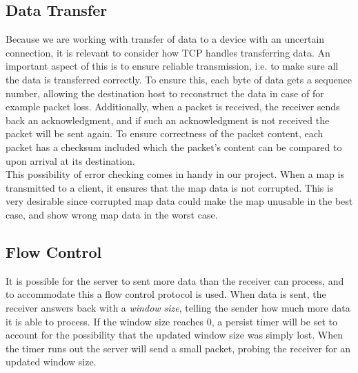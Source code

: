 \subsection{Data Transfer}
Because we are working with transfer of data to a device with an uncertain connection, it is relevant to consider how TCP handles transferring data. An important aspect of this is to ensure reliable transmission, i.e. to make sure all the data is transferred correctly. To ensure this, each byte of data gets a sequence number, allowing the destination host to reconstruct the data in case of for example packet loss. Additionally, when a packet is received, the receiver sends back an acknowledgment, and if such an acknowledgment is not received the packet will be sent again. To ensure correctness of the packet content, each packet has a checksum included which the packet's content can be compared to upon arrival at its destination.\\

This possibility of error checking comes in handy in our project. When a map is transmitted to a client, it ensures that the map data is not corrupted. This is very desirable since corrupted map data could make the map unusable in the best case, and show wrong map data in the worst case.

\subsection{Flow Control}
It is possible for the server to sent more data than the receiver can process, and to accommodate this a flow control protocol is used. When data is sent, the receiver answers back with a \textit{window size}, telling the sender how much more data it is able to process. If the window size reaches 0, a persist timer will be set to account for the possibility that the updated window size was simply lost. When the timer runs out the server will send a small packet, probing the receiver for an updated window size.


